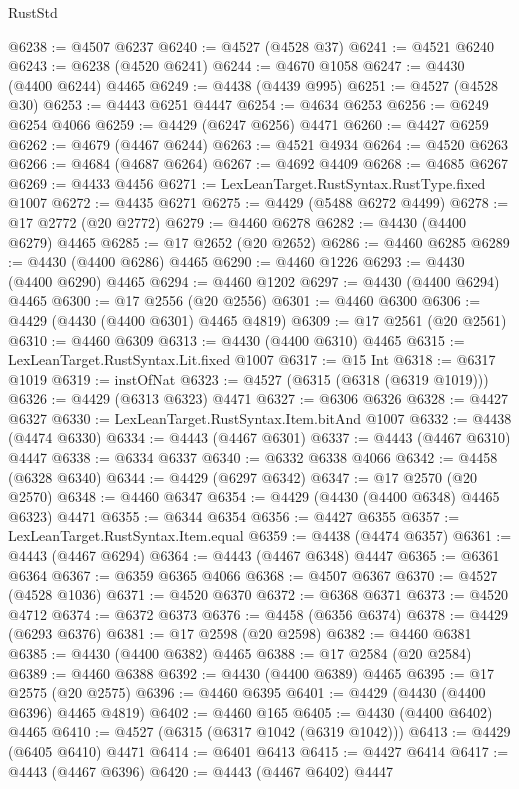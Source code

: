 \begin{lexlean}{RustStd}
\begin{coremodule}
@6238 := @4507 @6237
@6240 := @4527 (@4528 @37)
@6241 := @4521 @6240
@6243 := @6238 (@4520 @6241)
@6244 := @4670 @1058
@6247 := @4430 (@4400 @6244) @4465
@6249 := @4438 (@4439 @995)
@6251 := @4527 (@4528 @30)
@6253 := @4443 @6251 @4447
@6254 := @4634 @6253
@6256 := @6249 @6254 @4066
@6259 := @4429 (@6247 @6256) @4471
@6260 := @4427 @6259
@6262 := @4679 (@4467 @6244)
@6263 := @4521 @4934
@6264 := @4520 @6263
@6266 := @4684 (@4687 @6264)
@6267 := @4692 @4409
@6268 := @4685 @6267
@6269 := @4433 @4456
@6271 := LexLeanTarget.RustSyntax.RustType.fixed @1007
@6272 := @4435 @6271
@6275 := @4429 (@5488 @6272 @4499)
@6278 := @17 @2772 (@20 @2772)
@6279 := @4460 @6278
@6282 := @4430 (@4400 @6279) @4465
@6285 := @17 @2652 (@20 @2652)
@6286 := @4460 @6285
@6289 := @4430 (@4400 @6286) @4465
@6290 := @4460 @1226
@6293 := @4430 (@4400 @6290) @4465
@6294 := @4460 @1202
@6297 := @4430 (@4400 @6294) @4465
@6300 := @17 @2556 (@20 @2556)
@6301 := @4460 @6300
@6306 := @4429 (@4430 (@4400 @6301) @4465 @4819)
@6309 := @17 @2561 (@20 @2561)
@6310 := @4460 @6309
@6313 := @4430 (@4400 @6310) @4465
@6315 := LexLeanTarget.RustSyntax.Lit.fixed @1007
@6317 := @15 Int
@6318 := @6317 @1019
@6319 := instOfNat
@6323 := @4527 (@6315 (@6318 (@6319 @1019)))
@6326 := @4429 (@6313 @6323) @4471
@6327 := @6306 @6326
@6328 := @4427 @6327
@6330 := LexLeanTarget.RustSyntax.Item.bitAnd @1007
@6332 := @4438 (@4474 @6330)
@6334 := @4443 (@4467 @6301)
@6337 := @4443 (@4467 @6310) @4447
@6338 := @6334 @6337
@6340 := @6332 @6338 @4066
@6342 := @4458 (@6328 @6340)
@6344 := @4429 (@6297 @6342)
@6347 := @17 @2570 (@20 @2570)
@6348 := @4460 @6347
@6354 := @4429 (@4430 (@4400 @6348) @4465 @6323) @4471
@6355 := @6344 @6354
@6356 := @4427 @6355
@6357 := LexLeanTarget.RustSyntax.Item.equal
@6359 := @4438 (@4474 @6357)
@6361 := @4443 (@4467 @6294)
@6364 := @4443 (@4467 @6348) @4447
@6365 := @6361 @6364
@6367 := @6359 @6365 @4066
@6368 := @4507 @6367
@6370 := @4527 (@4528 @1036)
@6371 := @4520 @6370
@6372 := @6368 @6371
@6373 := @4520 @4712
@6374 := @6372 @6373
@6376 := @4458 (@6356 @6374)
@6378 := @4429 (@6293 @6376)
@6381 := @17 @2598 (@20 @2598)
@6382 := @4460 @6381
@6385 := @4430 (@4400 @6382) @4465
@6388 := @17 @2584 (@20 @2584)
@6389 := @4460 @6388
@6392 := @4430 (@4400 @6389) @4465
@6395 := @17 @2575 (@20 @2575)
@6396 := @4460 @6395
@6401 := @4429 (@4430 (@4400 @6396) @4465 @4819)
@6402 := @4460 @165
@6405 := @4430 (@4400 @6402) @4465
@6410 := @4527 (@6315 (@6317 @1042 (@6319 @1042)))
@6413 := @4429 (@6405 @6410) @4471
@6414 := @6401 @6413
@6415 := @4427 @6414
@6417 := @4443 (@4467 @6396)
@6420 := @4443 (@4467 @6402) @4447

\end{coremodule}
\end{lexlean}

